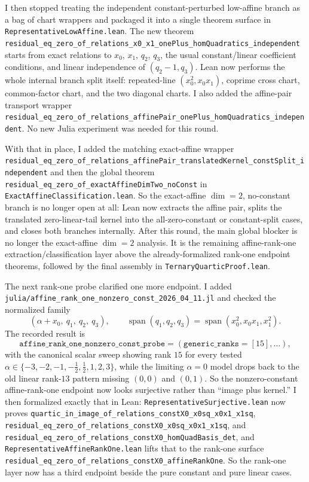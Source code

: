 \documentclass[11pt]{article}
\begin{document}
I then stopped treating the independent constant-perturbed low-affine branch as
a bag of chart wrappers and packaged it into a single theorem surface in
\texttt{RepresentativeLowAffine.lean}. The new theorem
\texttt{residual\_eq\_zero\_of\_relations\_x0\_x1\_onePlus\_homQuadratics\_independent}
starts from exact relations to \(x_0\), \(x_1\), \(q_2\), \(q_3\), the usual
constant/linear coefficient conditions, and linear independence of
\((q_2-1,q_3)\). Lean now performs the whole internal branch split itself:
repeated-line \((x_0^2,x_0x_1)\), coprime cross chart, common-factor chart,
and the two diagonal charts. I also added the affine-pair transport wrapper
\texttt{residual\_eq\_zero\_of\_relations\_affinePair\_onePlus\_homQuadratics\_independent}.
No new Julia experiment was needed for this round.

With that in place, I added the matching exact-affine wrapper
\texttt{residual\_eq\_zero\_of\_relations\_affinePair\_translatedKernel\_constSplit\_independent}
and then the global theorem
\texttt{residual\_eq\_zero\_of\_exactAffineDimTwo\_noConst} in
\texttt{ExactAffineClassification.lean}. So the exact-affine \(\dim = 2\),
no-constant branch is no longer open at all: Lean now extracts the affine pair,
splits the translated zero-linear-tail kernel into the all-zero-constant or
constant-split cases, and closes both branches internally. After this round,
the main global blocker is no longer the exact-affine \(\dim = 2\) analysis. It
is the remaining affine-rank-one extraction/classification layer above the
already-formalized rank-one endpoint theorems, followed by the final assembly
in \texttt{TernaryQuarticProof.lean}.

The next rank-one probe clarified one more endpoint. I added
\texttt{julia/affine\_rank\_one\_nonzero\_const\_2026\_04\_11.jl} and checked
the normalized family
\[
  (\alpha + x_0,\ q_1,\ q_2,\ q_3),
  \qquad \operatorname{span}(q_1,q_2,q_3)=
    \operatorname{span}(x_0^2,x_0x_1,x_1^2).
\]
The recorded result is
\[
  \texttt{affine\_rank\_one\_nonzero\_const\_probe}
  = (\texttt{generic\_ranks}=[15],\dots),
\]
with the canonical scalar sweep showing rank \(15\) for every tested
\(\alpha \in \{-3,-2,-1,-\tfrac12,\tfrac12,1,2,3\}\), while the limiting
\(\alpha=0\) model drops back to the old linear rank-\(13\) pattern missing
\((0,0)\) and \((0,1)\). So the nonzero-constant affine-rank-one endpoint now
looks surjective rather than ``image plus kernel.'' I then formalized exactly
that in Lean:
\texttt{RepresentativeSurjective.lean} now proves
\texttt{quartic\_in\_image\_of\_relations\_constX0\_x0sq\_x0x1\_x1sq},
\texttt{residual\_eq\_zero\_of\_relations\_constX0\_x0sq\_x0x1\_x1sq}, and
\texttt{residual\_eq\_zero\_of\_relations\_constX0\_homQuadBasis\_det}, and
\texttt{RepresentativeAffineRankOne.lean} lifts that to the rank-one surface
\texttt{residual\_eq\_zero\_of\_relations\_constX0\_affineRankOne}. So the
rank-one layer now has a third endpoint beside the pure constant and pure
linear cases.
\end{document}
